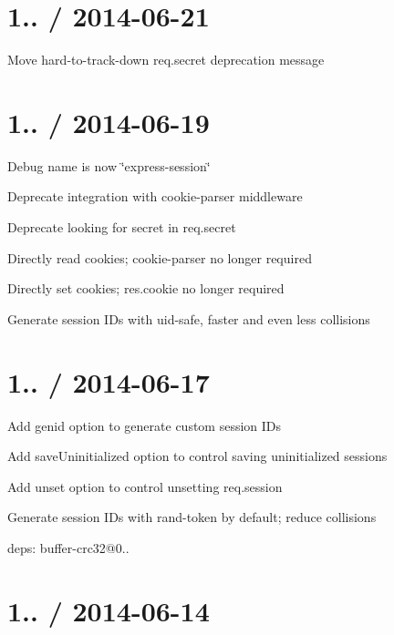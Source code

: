 \section*{1.. / 2014-\/06-\/21 }


\begin{DoxyItemize}
\item Move hard-\/to-\/track-\/down {\ttfamily req.\+secret} deprecation message
\end{DoxyItemize}

\section*{1.. / 2014-\/06-\/19 }


\begin{DoxyItemize}
\item Debug name is now \char`\"{}express-\/session\char`\"{}
\item Deprecate integration with {\ttfamily cookie-\/parser} middleware
\item Deprecate looking for secret in {\ttfamily req.\+secret}
\item Directly read cookies; {\ttfamily cookie-\/parser} no longer required
\item Directly set cookies; {\ttfamily res.\+cookie} no longer required
\item Generate session I\+Ds with {\ttfamily uid-\/safe}, faster and even less collisions
\end{DoxyItemize}

\section*{1.. / 2014-\/06-\/17 }


\begin{DoxyItemize}
\item Add {\ttfamily genid} option to generate custom session I\+Ds
\item Add {\ttfamily save\+Uninitialized} option to control saving uninitialized sessions
\item Add {\ttfamily unset} option to control unsetting {\ttfamily req.\+session}
\item Generate session I\+Ds with {\ttfamily rand-\/token} by default; reduce collisions
\item deps\+: buffer-\/crc32@0..
\end{DoxyItemize}

\section*{1.. / 2014-\/06-\/14 }


